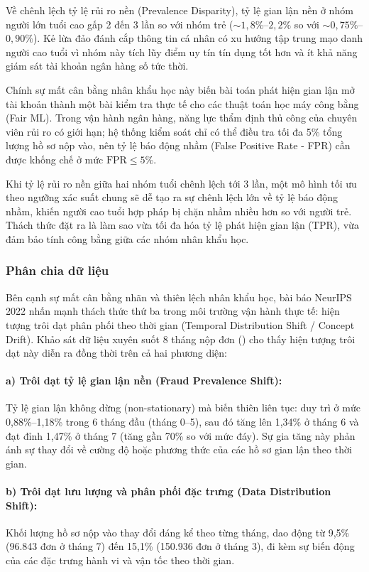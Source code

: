 Về chênh lệch tỷ lệ rủi ro nền (Prevalence Disparity), tỷ lệ gian lận nền ở nhóm người lớn tuổi cao gấp 2 đến 3 lần so với nhóm trẻ ($\sim 1,8\%$--$2,2\%$ so với $\sim 0,75\%$--$0,90\%$). Kẻ lừa đảo đánh cắp thông tin cá nhân có xu hướng tập trung mạo danh người cao tuổi vì nhóm này tích lũy điểm uy tín tín dụng tốt hơn và ít khả năng giám sát tài khoản ngân hàng số tức thời.

Chính sự mất cân bằng nhân khẩu học này biến bài toán phát hiện gian lận mở tài khoản thành một bài kiểm tra thực tế cho các thuật toán học máy công bằng (Fair ML). Trong vận hành ngân hàng, năng lực thẩm định thủ công của chuyên viên rủi ro có giới hạn; hệ thống kiểm soát chỉ có thể điều tra tối đa 5\% tổng lượng hồ sơ nộp vào, nên tỷ lệ báo động nhầm (False Positive Rate - FPR) cần được khống chế ở mức $\text{FPR} \le 5\%$.

Khi tỷ lệ rủi ro nền giữa hai nhóm tuổi chênh lệch tới 3 lần, một mô hình tối ưu theo ngưỡng xác suất chung sẽ dễ tạo ra sự chênh lệch lớn về tỷ lệ báo động nhầm, khiến người cao tuổi hợp pháp bị chặn nhầm nhiều hơn so với người trẻ. Thách thức đặt ra là làm sao vừa tối đa hóa tỷ lệ phát hiện gian lận (TPR), vừa đảm bảo tính công bằng giữa các nhóm nhân khẩu học.

\subsubsection{Phân chia dữ liệu}
Bên cạnh sự mất cân bằng nhãn và thiên lệch nhân khẩu học, bài báo NeurIPS 2022 \cite{jesus2022turning} nhấn mạnh thách thức thứ ba trong môi trường vận hành thực tế: hiện tượng trôi dạt phân phối theo thời gian (Temporal Distribution Shift / Concept Drift). Khảo sát dữ liệu xuyên suốt 8 tháng nộp đơn () cho thấy hiện tượng trôi dạt này diễn ra đồng thời trên cả hai phương diện:

\paragraph{a) Trôi dạt tỷ lệ gian lận nền (Fraud Prevalence Shift):}
Tỷ lệ gian lận không dừng (non-stationary) mà biến thiên liên tục: duy trì ở mức 0,88\%--1,18\% trong 6 tháng đầu (tháng 0--5), sau đó tăng lên 1,34\% ở tháng 6 và đạt đỉnh 1,47\% ở tháng 7 (tăng gần 70\% so với mức đáy). Sự gia tăng này phản ánh sự thay đổi về cường độ hoặc phương thức của các hồ sơ gian lận theo thời gian.

\paragraph{b) Trôi dạt lưu lượng và phân phối đặc trưng (Data Distribution Shift):}
Khối lượng hồ sơ nộp vào thay đổi đáng kể theo từng tháng, dao động từ 9,5\% (96.843 đơn ở tháng 7) đến 15,1\% (150.936 đơn ở tháng 3), đi kèm sự biến động của các đặc trưng hành vi và vận tốc theo thời gian.

